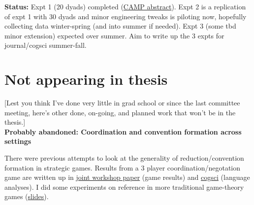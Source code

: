 \documentclass[]{article}
\begin{document}
\textbf{Status:} Expt 1 (20 dyads) completed (\href{https://github.com/vboyce/kid-tangrams/blob/main/write-ups/CAMP6/abstract.pdf}{CAMP abstract}). Expt 2 is a replication of expt 1 with 30 dyads and minor engineering tweaks is piloting now, hopefully collecting data winter-spring (and into summer if needed). Expt 3 (some tbd minor extension) expected over summer. Aim to write up the 3 expts for journal/cogsci summer-fall. 


\section*{Not appearing in thesis}

[Lest you think I've done very little in grad school or since the last committee meeting, here's other done,  on-going, and planned work that won't be in the thesis.]\\

\noindent\textbf{Probably abandoned: Coordination and convention formation across settings} 

There were previous attempts to look at the generality of reduction/convention formation in strategic games. Results from a 3 player coordination/negotation game are written up in  \href{https://osf.io/preprints/psyarxiv/tfb3d}{joint workshop paper} (game results) and \href{https://escholarship.org/uc/item/8dq8c2s6}{cogsci} (language analyses). I did some experiments on reference in more traditional game-theory games (\href{https://docs.google.com/presentation/d/1CzJ6fl6PEJ6NepUwjKKINLlVa80AAEMAQj4s5idrwIA/edit#slide=id.p}{slides}). \\
\end{document}
